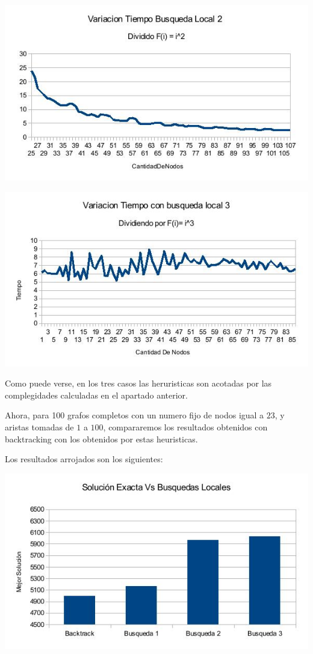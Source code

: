 \includegraphics[scale=0.5]{Ej4/tiempo2div.jpg}

\includegraphics[scale=0.5]{Ej4/tiempo3div.jpg}

Como puede verse, en los tres casos las heruristicas son acotadas por las complegidades calculadas en el apartado anterior.

Ahora, para 100 grafos completos con un numero fijo de nodos igual a $23$, y aristas tomadas de $1$ a $100$, compararemos los resultados obtenidos con backtracking con los obtenidos por estas heuristicas.

Los resultados arrojados son los siguientes:

\includegraphics[scale=0.5]{Ej4/solucionestodos.jpg}

